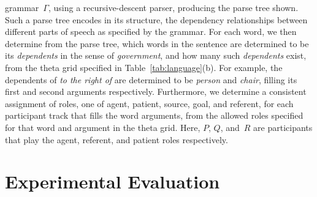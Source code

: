 grammar~$\Gamma$, using a recursive-descent parser, producing
the parse tree shown.
%
Such a parse tree encodes in its structure, the dependency relationships
between different parts of speech as specified by the grammar.
%
For each word, we then determine from the parse tree, which words in the
sentence are determined to be its \textsl{dependents} in the sense of
\textsl{government}, and how many such \textsl{dependents} exist, from the
theta grid specified in Table~\ref{tab:language}(b).
%
For example, the dependents of \emph{to the right of} are determined to be
\emph{person} and \emph{chair}, filling its first and second arguments
respectively.
%
Furthermore, we determine a consistent assignment of roles, one of agent,
patient, source, goal, and referent, for each participant track that fills the
word arguments, from the allowed roles specified for that word
and argument in the theta grid.
%
Here, $P$, $Q$, and~$R$ are participants that play the agent, referent, and
patient roles respectively.

\vspace*{-2ex}
\section{Experimental Evaluation}
\label{sec:experiments}
\vspace*{-2ex}

